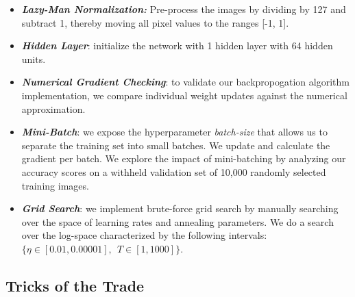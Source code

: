 \documentclass{article} %
\begin{document}
\begin{itemize}
\item \textbf{\textit{Lazy-Man Normalization:}} Pre-process the images by dividing by 127 and subtract 1, thereby moving all pixel values to the ranges [-1, 1]. 
\item \textbf{\textit{Hidden Layer}}: initialize the network with 1 hidden layer with 64 hidden units.  
\item \textbf{\textit{Numerical Gradient Checking}}: to validate our backpropogation algorithm implementation, we compare individual weight updates against the numerical approximation.
\item \textbf{\textit{Mini-Batch}}: we expose the hyperparameter \textit{batch-size} that allows us to separate the training set into small batches.  We update and calculate the gradient per batch.  We explore the impact of mini-batching by analyzing our accuracy scores on a withheld validation set of 10,000 randomly selected training images.  
\item \textbf{\textit{Grid Search}}: we implement brute-force grid search by manually searching over the space of learning rates and annealing parameters.  We do a search over the log-space characterized by the following intervals: $\{\eta \in [0.01, 0.00001], \ \ T \in [1, 1000] \}$. 
\end{itemize}  

\newpage

\subsection*{Tricks of the Trade}
\end{document}
